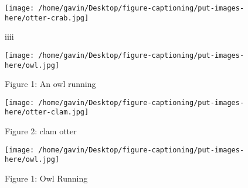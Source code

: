 \begin{figure}
\caption{iiii}
\begin{center}
\texttt{[image: /home/gavin/Desktop/figure-captioning/put-images-here/otter-crab.jpg]}
\label{fig:otter-crab}
\end{center}
\end{figure}
\begin{figure}
\caption{Figure 1: An owl running}
\begin{center}
\texttt{[image: /home/gavin/Desktop/figure-captioning/put-images-here/owl.jpg]}
\label{fig:owl}
\end{center}
\end{figure}
\begin{figure}
\caption{Figure 2: clam otter}
\begin{center}
\texttt{[image: /home/gavin/Desktop/figure-captioning/put-images-here/otter-clam.jpg]}
\label{fig:otter-clam}
\end{center}
\end{figure}
\begin{figure}
\caption{Figure 1: Owl Running}
\begin{center}
\texttt{[image: /home/gavin/Desktop/figure-captioning/put-images-here/owl.jpg]}
\label{fig:owl}
\end{center}
\end{figure}